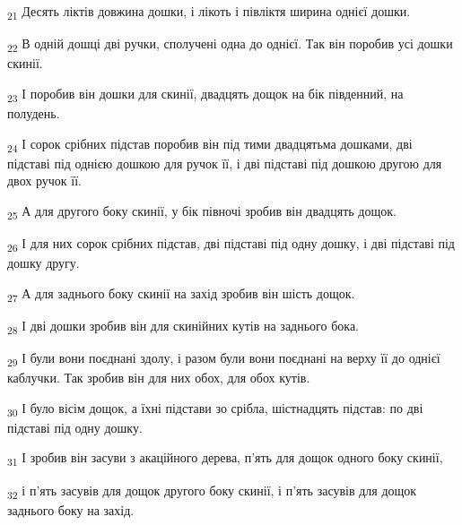 \begin{tcolorbox}
\textsubscript{21} Десять ліктів довжина дошки, і лікоть і півліктя ширина однієї дошки.
\end{tcolorbox}
\begin{tcolorbox}
\textsubscript{22} В одній дошці дві ручки, сполучені одна до однієї. Так він поробив усі дошки скинії.
\end{tcolorbox}
\begin{tcolorbox}
\textsubscript{23} І поробив він дошки для скинії, двадцять дощок на бік південний, на полудень.
\end{tcolorbox}
\begin{tcolorbox}
\textsubscript{24} І сорок срібних підстав поробив він під тими двадцятьма дошками, дві підставі під однією дошкою для ручок її, і дві підставі під дошкою другою для двох ручок її.
\end{tcolorbox}
\begin{tcolorbox}
\textsubscript{25} А для другого боку скинії, у бік півночі зробив він двадцять дощок.
\end{tcolorbox}
\begin{tcolorbox}
\textsubscript{26} І для них сорок срібних підстав, дві підставі під одну дошку, і дві підставі під дошку другу.
\end{tcolorbox}
\begin{tcolorbox}
\textsubscript{27} А для заднього боку скинії на захід зробив він шість дощок.
\end{tcolorbox}
\begin{tcolorbox}
\textsubscript{28} І дві дошки зробив він для скинійних кутів на заднього бока.
\end{tcolorbox}
\begin{tcolorbox}
\textsubscript{29} І були вони поєднані здолу, і разом були вони поєднані на верху її до однієї каблучки. Так зробив він для них обох, для обох кутів.
\end{tcolorbox}
\begin{tcolorbox}
\textsubscript{30} І було вісім дощок, а їхні підстави зо срібла, шістнадцять підстав: по дві підставі під одну дошку.
\end{tcolorbox}
\begin{tcolorbox}
\textsubscript{31} І зробив він засуви з акаційного дерева, п'ять для дощок одного боку скинії,
\end{tcolorbox}
\begin{tcolorbox}
\textsubscript{32} і п'ять засувів для дощок другого боку скинії, і п'ять засувів для дощок заднього боку на захід.
\end{tcolorbox}
